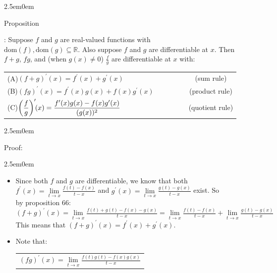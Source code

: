 \documentclass{book}
\newcommand{\hTwo}{%
   \color{MidnightBlue}%
   \fontsize{13}{15}\selectfont%
}
\newcommand{\hThree}{%
   \color{PineGreen!85!Orange}
   \fontsize{13}{15}\selectfont%
}
\newcommand{\hFour}{%
   \color{Cerulean}
   \fontsize{12}{14}\selectfont%
}
\newenvironment{myIndent}{%
   \begin{adjustwidth}{2.5em}{0em}%
}{%
   \end{adjustwidth}%
}
\newcommand{\domain}[1]{\mathrm{dom}(#1)}
\newcounter{PropNumber}
\newcommand{\propCount}[1][1]{%
   \addtocounter{PropNumber}{#1}%
   \thePropNumber%
}
\newcommand{\retTwo}{\hfill\bigbreak}
\begin{document}
\newpage

{\begin{myIndent}\hTwo
   Proposition \propCount: Suppose $f$ and $g$ are real-valued functions with\\ $\domain{f}, \domain{g} \subseteq \mathbb{R}$. Also suppose $f$ and $g$ are differentiable at $x$. Then\\ $f + g$, $fg$, and (when $g(x) \neq 0$) $\frac{f}{g}$ are differentiable at $x$ with:\\
   
   \begin{tabular}{l c c c c c}
      (A)\quad\quad $(f + g)^\prime(x) = f^\prime(x) + g^\prime(x)$ & &&&&{\hFour(sum rule)} \\ [4pt]
      (B)\quad\quad $(fg)^\prime(x) = f^\prime(x)g(x) + f(x)g^\prime(x)$ & &&&& {\hFour(product rule)} \\ [4pt]
      (C)\quad\quad $\left(\dfrac{f}{g}\right)^\prime\hspace{-0.3em}(x) = \dfrac{f^\prime(x)g(x) - f(x)g^\prime(x)}{(g(x))^2}$ & &&&& {\hFour(quotient rule)}
   \end{tabular}\retTwo

   \begin{myIndent}\hThree
      Proof:
      \begin{myIndent}
         \begin{itemize}
            \item[(A)] Since both $f$ and $g$ are differentiable, we know that both\\ $f^\prime(x) = \lim\limits_{t\rightarrow x}\frac{f(t) - f(x)}{t - x}$ and $g^\prime(x) = \lim\limits_{t\rightarrow x}\frac{g(t) - g(x)}{t - x}$ exist. So\\ by proposition 66:\\ [-11pt]
            
            \hspace{-1.5em}${(f + g)^\prime(x) = \lim\limits_{t\rightarrow x}\frac{f(t) + g(t) - f(x) - g(x)}{t-x} = \lim\limits_{t\rightarrow x}\frac{f(t) - f(x)}{t - x} + \lim\limits_{t\rightarrow x}\frac{g(t) - g(x)}{t - x}}$\\ [4pt]

            This means that $(f + g)^\prime(x) = f^\prime(x) + g^\prime(x)$.\\ [-2pt]

            \item[(B)] Note that:\\
            \begin{tabular}{l}
               $(fg)^\prime(x) = \lim\limits_{t\rightarrow x}\frac{f(t)g(t) - f(x)g(x)}{t-x}$ \\


\end{tabular}
\end{itemize}
\end{myIndent}
\end{myIndent}
\end{myIndent}}
\end{document}
